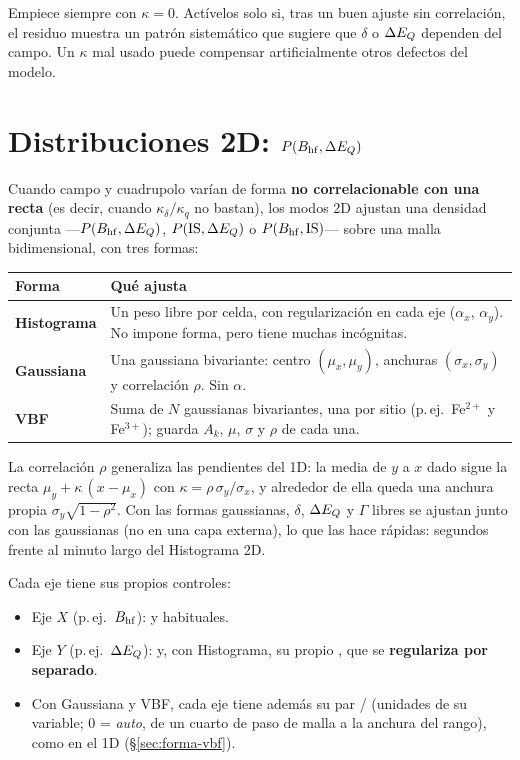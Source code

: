 \begin{truco}
Empiece siempre con $\kappa=0$. Actívelos solo si, tras un buen ajuste sin
correlación, el residuo muestra un patrón sistemático que sugiere que $\delta$ o
$\Delta E_{Q}$ dependen del campo. Un $\kappa$ mal usado puede compensar artificialmente
otros defectos del modelo.
\end{truco}

\section{Distribuciones 2D: $P(B_{\mathrm{hf}}, \Delta E_{Q})$}
\label{sec:dist-2d}

Cuando campo y cuadrupolo varían de forma \textbf{no correlacionable con una
recta} (es decir, cuando $\kappa_\delta/\kappa_q$ no bastan), los modos 2D
ajustan una densidad conjunta —$P(B_{\mathrm{hf}}, \Delta E_{Q})$, $P(\text{IS}, \Delta E_{Q})$ o
$P(B_{\mathrm{hf}}, \text{IS})$— sobre una malla bidimensional, con tres formas:

\begin{center}
\begin{tabular}{@{}p{}p{}@{}}
\toprule
\textbf{Forma} & \textbf{Qué ajusta} \\
\midrule
\textbf{Histograma} & Un peso libre por celda, con regularización en cada eje
($\alpha_x$, $\alpha_y$). No impone forma, pero tiene muchas incógnitas. \\[3pt]
\textbf{Gaussiana} & Una gaussiana bivariante: centro $(\mu_x,\mu_y)$, anchuras
$(\sigma_x,\sigma_y)$ y correlación $\rho$. Sin $\alpha$. \\[3pt]
\textbf{VBF} & Suma de $N$ gaussianas bivariantes, una por sitio (p.\,ej.\
Fe$^{2+}$ y Fe$^{3+}$); guarda $A_k$, $\mu$, $\sigma$ y $\rho$ de cada una. \\
\bottomrule
\end{tabular}
\end{center}

La correlación $\rho$ generaliza las pendientes del 1D: la media de $y$ a $x$ dado
sigue la recta $\mu_y + \kappa\,(x-\mu_x)$ con $\kappa = \rho\,\sigma_y/\sigma_x$, y
alrededor de ella queda una anchura propia $\sigma_y\sqrt{1-\rho^2}$. Con las formas
gaussianas, $\delta$, $\Delta E_{Q}$ y $\Gamma$ libres se ajustan junto con las gaussianas
(no en una capa externa), lo que las hace rápidas: segundos frente al minuto largo
del Histograma 2D.

Cada eje tiene sus propios controles:

\begin{itemize}[nosep]
  \item Eje $X$ (p.\,ej.\ $B_{\mathrm{hf}}$):  y 
        habituales.
  \item Eje $Y$ (p.\,ej.\ $\Delta E_{Q}$):  y, con
        Histograma, su propio \menu{log$_{10}\alpha$}, que se \textbf{regulariza
        por separado}.
  \item Con Gaussiana y VBF, cada eje tiene además su par  /
        \menu{$\sigma$ máx} (unidades de su variable; $0$ = \emph{auto}, de un
        cuarto de paso de malla a la anchura del rango), como en el 1D
        (§\ref{sec:forma-vbf}).
\end{itemize}


